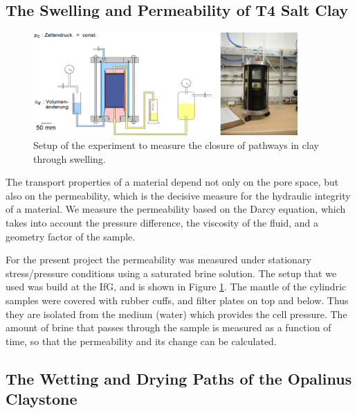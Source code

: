 \subsection{The Swelling and Permeability of T4 Salt Clay}
\label{sec:t4swell}

\begin{figure}[ht]
\centering
\includegraphics[width=0.9\textwidth]{figures/IfG-T4-Perm-aufbau.png}
\caption{Setup of the experiment to measure the closure of pathways in clay through
swelling.}
\label{fig:t4swellsetup}
\end{figure}

The transport properties of a material depend not only on the pore space, but also on the permeability, which is the decisive measure for the hydraulic integrity of a material. We measure the permeability based on the Darcy equation, which takes into account the pressure difference, the viscosity of the fluid, and a geometry factor of the sample.

For the present project the permeability was measured under stationary stress/pressure conditions using a saturated brine solution. The setup that we used was build at the IfG, and is shown in Figure \ref{fig:t4swellsetup}. The mantle of the cylindric samples were covered with rubber cuffs, and filter plates on top and below. Thus they are isolated from the medium (water) which provides the cell pressure. The amount of brine that passes through the sample is measured as a function of time, so that the permeability and its change can be calculated. 


\subsection{The Wetting and Drying Paths of the Opalinus Claystone}
\label{sec:Shrinkage_Swelling_Exp}

